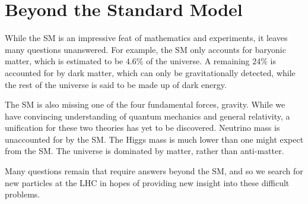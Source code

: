\section{Beyond the Standard Model}
While the SM is an impressive feat of mathematics and experiments, it leaves many questions unanswered. For example, the SM only accounts for baryonic matter, which is estimated to be $4.6\%$ of the universe. A remaining $24\%$ is accounted for by dark matter, which can only be gravitationally detected, while the rest of the universe is said to be made up of dark energy.

The SM is also missing one of the four fundamental forces, gravity. While we have convincing understanding of quantum mechanics and general relativity, a unification for these two theories has yet to be discovered. Neutrino mass is unaccounted for by the SM. The Higgs mass is much lower than one might expect from the SM. The universe is dominated by matter, rather than anti-matter. 

Many questions remain that require answers beyond the SM, and so we search for new particles at the LHC in hopes of providing new insight into these difficult problems.